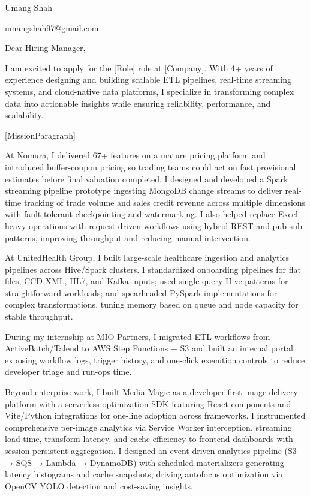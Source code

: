 \documentclass[11pt]{article}
\begin{document}
\noindent
Umang Shah
\par
umangshah97@gmail.com
\par
\vspace{0.5em}

Dear Hiring Manager,

I am excited to apply for the [Role] role at [Company]. With 4+ years of experience designing and building scalable ETL pipelines, real-time streaming systems, and cloud-native data platforms, I specialize in transforming complex data into actionable insights while ensuring reliability, performance, and scalability.

[MissionParagraph]

At Nomura, I delivered 67+ features on a mature pricing platform and introduced buffer-coupon pricing so trading teams could act on fast provisional estimates before final valuation completed. I designed and developed a Spark streaming pipeline prototype ingesting MongoDB change streams to deliver real-time tracking of trade volume and sales credit revenue across multiple dimensions with fault-tolerant checkpointing and watermarking. I also helped replace Excel-heavy operations with request-driven workflows using hybrid REST and pub-sub patterns, improving throughput and reducing manual intervention.

At UnitedHealth Group, I built large-scale healthcare ingestion and analytics pipelines across Hive/Spark clusters. I standardized onboarding pipelines for flat files, CCD XML, HL7, and Kafka inputs; used single-query Hive patterns for straightforward workloads; and spearheaded PySpark implementations for complex transformations, tuning memory based on queue and node capacity for stable throughput.

During my internship at MIO Partners, I migrated ETL workflows from ActiveBatch/Talend to AWS Step Functions + S3 and built an internal portal exposing workflow logs, trigger history, and one-click execution controls to reduce developer triage and run-ops time.

Beyond enterprise work, I built Media Magic as a developer-first image delivery platform with a serverless optimization SDK featuring React components and Vite/Python integrations for one-line adoption across frameworks. I instrumented comprehensive per-image analytics via Service Worker interception, streaming load time, transform latency, and cache efficiency to frontend dashboards with session-persistent aggregation. I designed an event-driven analytics pipeline (S3 → SQS → Lambda → DynamoDB) with scheduled materializers generating latency histograms and cache snapshots, driving autofocus optimization via OpenCV YOLO detection and cost-saving insights.
\end{document}
